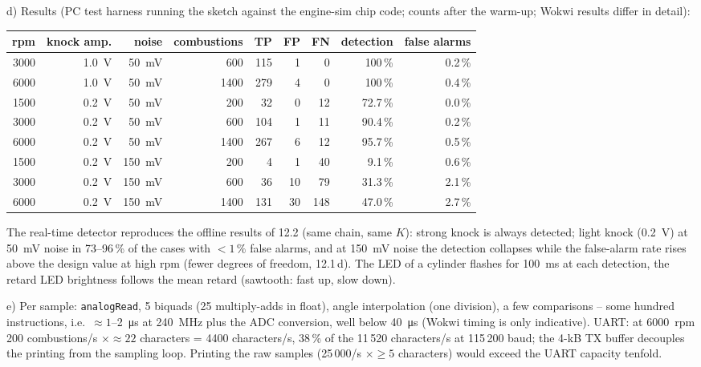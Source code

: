 \begin{solution}
d) Results (PC test harness running the sketch against the engine-sim chip code;
counts after the warm-up; Wokwi results differ in detail):
\begin{center}
\small
\begin{tabular}{@{}rrrrrrrrr@{}}
\toprule
rpm & knock amp. & noise & combustions & TP & FP & FN & detection & false alarms\\
\midrule
3000 & \SI{1.0}{V} & \SI{50}{mV} & 600 & 115 & 1 & 0 & 100\,\% & 0.2\,\%\\
6000 & \SI{1.0}{V} & \SI{50}{mV} & 1400 & 279 & 4 & 0 & 100\,\% & 0.4\,\%\\
1500 & \SI{0.2}{V} & \SI{50}{mV} & 200 & 32 & 0 & 12 & 72.7\,\% & 0.0\,\%\\
3000 & \SI{0.2}{V} & \SI{50}{mV} & 600 & 104 & 1 & 11 & 90.4\,\% & 0.2\,\%\\
6000 & \SI{0.2}{V} & \SI{50}{mV} & 1400 & 267 & 6 & 12 & 95.7\,\% & 0.5\,\%\\
1500 & \SI{0.2}{V} & \SI{150}{mV} & 200 & 4 & 1 & 40 & 9.1\,\% & 0.6\,\%\\
3000 & \SI{0.2}{V} & \SI{150}{mV} & 600 & 36 & 10 & 79 & 31.3\,\% & 2.1\,\%\\
6000 & \SI{0.2}{V} & \SI{150}{mV} & 1400 & 131 & 30 & 148 & 47.0\,\% & 2.7\,\%\\
\bottomrule
\end{tabular}
\end{center}
The real-time detector reproduces the offline results of 12.2 (same chain, same $K$):
strong knock is always detected; light knock (\SI{0.2}{V}) at \SI{50}{mV} noise in
73--96\,\% of the cases with $<1\,\%$ false alarms, and at \SI{150}{mV} noise the
detection collapses while the false-alarm rate rises above the design value at high
rpm (fewer degrees of freedom, 12.1\,d). The LED of a cylinder flashes for \SI{100}{ms}
at each detection, the retard LED brightness follows the mean retard (sawtooth: fast
up, slow down).

e) Per sample: \texttt{analogRead}, 5 biquads (25 multiply-adds in float), angle
interpolation (one division), a few comparisons -- some hundred instructions, i.e.\
$\approx1$--\SI{2}{\micro s} at \SI{240}{MHz} plus the ADC conversion, well below
\SI{40}{\micro s} (Wokwi timing is only indicative). UART: at \SI{6000}{rpm} 200
combustions/s $\times\approx22$ characters = 4400 characters/s, 38\,\% of the
11\,520 characters/s at 115\,200 baud; the 4-kB TX buffer decouples the printing from
the sampling loop. Printing the raw samples (25\,000/s $\times\ge5$ characters) would
exceed the UART capacity tenfold.


\end{solution}
